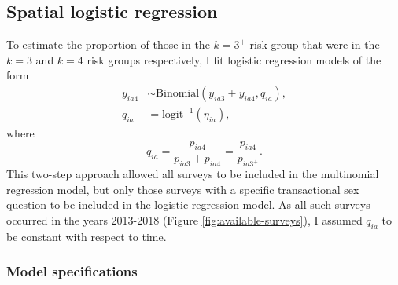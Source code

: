 \documentclass[a4paper, nobind]{templates/ociamthesis}
\begin{document}
\hypertarget{s-logistic}{%
\subsection{Spatial logistic regression}\label{s-logistic}}

To estimate the proportion of those in the \(k = 3^{+}\) risk group that were in the \(k = 3\) and \(k = 4\) risk groups respectively, I fit logistic regression models of the form
\begin{align}
    y_{ia4} &\sim \text{Binomial} \left( y_{ia3} + y_{ia4}, q_{ia} \right), \label{eq:logistic-regression} \\
    q_{ia} &= \text{logit}^{-1} \left( \eta_{ia} \right), 
\end{align}
where
\begin{equation}
q_{ia} = \frac{p_{ia4}}{p_{ia3} + p_{ia4}} = \frac{p_{ia4}}{p_{ia{3^+}}}.
\end{equation}
This two-step approach allowed all surveys to be included in the multinomial regression model, but only those surveys with a specific transactional sex question to be included in the logistic regression model.
As all such surveys occurred in the years 2013-2018 (Figure \ref{fig:available-surveys}), I assumed \(q_{ia}\) to be constant with respect to time.

\hypertarget{model-specifications-1}{%
\subsubsection{Model specifications}\label{model-specifications-1}}
\end{document}
